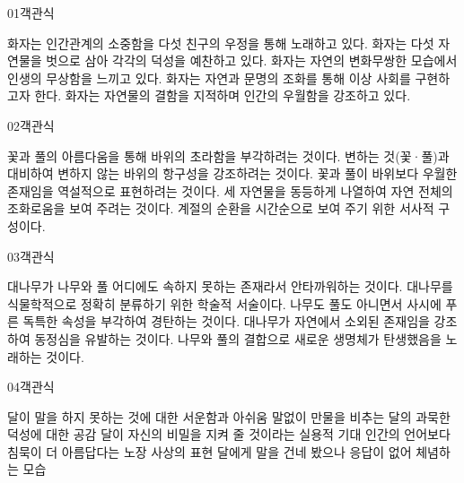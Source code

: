 \documentclass[fs85,seriesWit]{korfarm-base}
\begin{document}

\kfBeginMC
\begin{kfQBlock}{01}{객관식}
\begin{kfChoices}
\kfChoice 화자는 인간관계의 소중함을 다섯 친구의 우정을 통해 노래하고 있다.
\kfChoice 화자는 다섯 자연물을 벗으로 삼아 각각의 덕성을 예찬하고 있다.
\kfChoice 화자는 자연의 변화무쌍한 모습에서 인생의 무상함을 느끼고 있다.
\kfChoice 화자는 자연과 문명의 조화를 통해 이상 사회를 구현하고자 한다.
\kfChoice 화자는 자연물의 결함을 지적하며 인간의 우월함을 강조하고 있다.
\end{kfChoices}
\end{kfQBlock}

\begin{kfQBlock}{02}{객관식}
\begin{kfChoices}
\kfChoice 꽃과 풀의 아름다움을 통해 바위의 초라함을 부각하려는 것이다.
\kfChoice 변하는 것(꽃·풀)과 대비하여 변하지 않는 바위의 항구성을 강조하려는 것이다.
\kfChoice 꽃과 풀이 바위보다 우월한 존재임을 역설적으로 표현하려는 것이다.
\kfChoice 세 자연물을 동등하게 나열하여 자연 전체의 조화로움을 보여 주려는 것이다.
\kfChoice 계절의 순환을 시간순으로 보여 주기 위한 서사적 구성이다.
\end{kfChoices}
\end{kfQBlock}

\begin{kfQBlock}{03}{객관식}
\begin{kfChoices}
\kfChoice 대나무가 나무와 풀 어디에도 속하지 못하는 존재라서 안타까워하는 것이다.
\kfChoice 대나무를 식물학적으로 정확히 분류하기 위한 학술적 서술이다.
\kfChoice 나무도 풀도 아니면서 사시에 푸른 독특한 속성을 부각하여 경탄하는 것이다.
\kfChoice 대나무가 자연에서 소외된 존재임을 강조하여 동정심을 유발하는 것이다.
\kfChoice 나무와 풀의 결합으로 새로운 생명체가 탄생했음을 노래하는 것이다.
\end{kfChoices}
\end{kfQBlock}

\begin{kfQBlock}{04}{객관식}
\begin{kfChoices}
\kfChoice 달이 말을 하지 못하는 것에 대한 서운함과 아쉬움
\kfChoice 말없이 만물을 비추는 달의 과묵한 덕성에 대한 공감
\kfChoice 달이 자신의 비밀을 지켜 줄 것이라는 실용적 기대
\kfChoice 인간의 언어보다 침묵이 더 아름답다는 노장 사상의 표현
\kfChoice 달에게 말을 건네 봤으나 응답이 없어 체념하는 모습
\end{kfChoices}
\end{kfQBlock}
\end{document}
